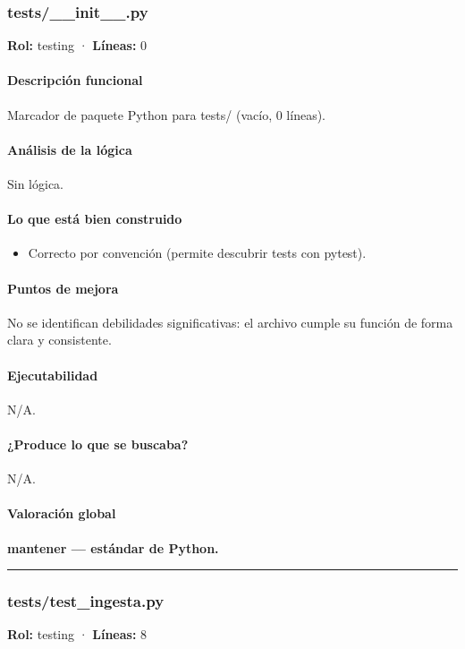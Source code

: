 \subsubsection{tests/\_\_init\_\_.py}
\textbf{Rol:} testing · \textbf{Líneas:} 0

\paragraph{Descripción funcional}
Marcador de paquete Python para tests/ (vacío, 0 líneas).

\paragraph{Análisis de la lógica}
Sin lógica.

\paragraph{Lo que está bien construido}
\begin{itemize}
  \item Correcto por convención (permite descubrir tests con pytest).
\end{itemize}

\paragraph{Puntos de mejora}
\noindent No se identifican debilidades significativas: el archivo cumple su función de forma clara y consistente.

\paragraph{Ejecutabilidad}
N/A.

\paragraph{¿Produce lo que se buscaba?}
N/A.

\paragraph{Valoración global}
\textbf{mantener --- estándar de Python.}

\medskip
\hrule

\subsubsection{tests/test\_ingesta.py}
\textbf{Rol:} testing · \textbf{Líneas:} 8

